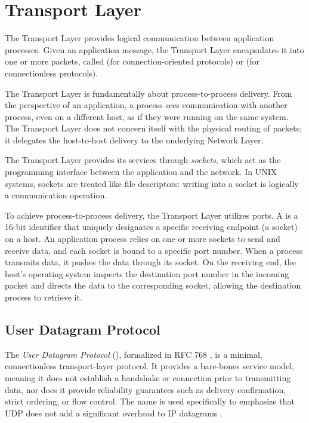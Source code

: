 \chapter{Transport Layer}
The Transport Layer provides logical communication between application processes.
Given an application message, the Transport Layer encapsulates it into one or more packets, called  (for connection-oriented protocols) or  (for connectionless protocols).

The Transport Layer is fundamentally about process-to-process delivery. 
From the perspective of an application, a process sees communication with another process, even on a different host, as if they were running on the same system. The Transport Layer does not concern itself with the physical routing of packets; it delegates the host-to-host delivery to the underlying Network Layer.

The Transport Layer provides its services through \emph{sockets}, which act as the programming interface between the application and the network. In UNIX systems, sockets are treated like file descriptors: writing into a socket is logically a communication operation.

To achieve process-to-process delivery, the Transport Layer utilizes ports. A  is a 16-bit identifier that uniquely designates a specific receiving endpoint (a socket) on a host. 
An application process relies on one or more sockets to send and receive data, and each socket is bound to a specific port number. When a process transmits data, it pushes the data through its socket. On the receiving end, the host's operating system inspects the destination port number in the incoming packet and directs the data to the corresponding socket, allowing the destination process to retrieve it.

\section{User Datagram Protocol}
The \emph{User Datagram Protocol} (), formalized in RFC 768 \cite{rfc768}, is a minimal, connectionless transport-layer protocol. 
It provides a bare-bones service model, meaning it does not establish a handshake or connection prior to transmitting data, nor does it provide reliability guarantees such as delivery confirmation, strict ordering, or flow control. 
The name  is used specifically to emphasize that UDP does not add a significant overhead to IP datagrams \cite{rfc768}. 

